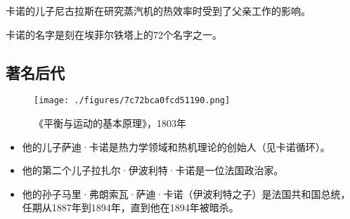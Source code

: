 卡诺的儿子尼古拉斯在研究蒸汽机的热效率时受到了父亲工作的影响。

卡诺的名字是刻在埃菲尔铁塔上的72个名字之一。
\subsection{著名后代}
\begin{figure}[ht]
\centering
\texttt{[image: ./figures/7c72bca0fcd51190.png]}
\caption{《平衡与运动的基本原理》，1803年} \label{fig_Lazare_7}
\end{figure}
\begin{itemize}
\item 他的儿子萨迪·卡诺是热力学领域和热机理论的创始人（见卡诺循环）。  
\item 他的第二个儿子拉扎尔·伊波利特·卡诺是一位法国政治家。  
\item 他的孙子马里·弗朗索瓦·萨迪·卡诺（伊波利特之子）是法国共和国总统，任期从1887年到1894年，直到他在1894年被暗杀。
\end{itemize}
